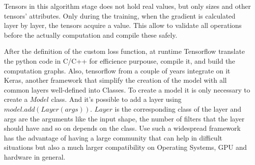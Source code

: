 \documentclass[12pt]{report}
\begin{document}
Tensors in this algorithm stage does not hold real values, but only sizes and other tensors' attributes.
Only during the training, when the gradient is calculated layer by layer, the tensors acquire a value.
This allow to validate all operations before the actually computation and compile these safely.

After the definition of the custom loss function, at runtime Tensorflow translate the python code in C/C++ for efficience purpouse, compile it, and build the computation graphs.
Also, tensorflow from a couple of years integrate on it Keras, another framework that simplify the creation of the model with 
all common layers well-defined into Classes.
To create a model it is only necessary to create a $Model$ class.
And it's possible to add a layer using $model.add(Layer(args))$.
$Layer$ is the corresponding class of the layer and args are the arguments like the input shape, the number of filters that the layer should have and so on depends on the class. 
Use such a widespread framework has the advantage of having a large community that can help in difficult situations but 
also a much larger compatibility on Operating Systems, GPU and hardware in general.


\end{document}
